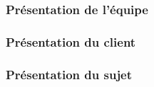 \subsection{} %

\begin{frame}
\frametitle{Présentation de l'équipe}
	
\end{frame}


\begin{frame}
\frametitle{Présentation du client}
	
\end{frame}


\begin{frame}
\frametitle{Présentation du sujet}

\end{frame}